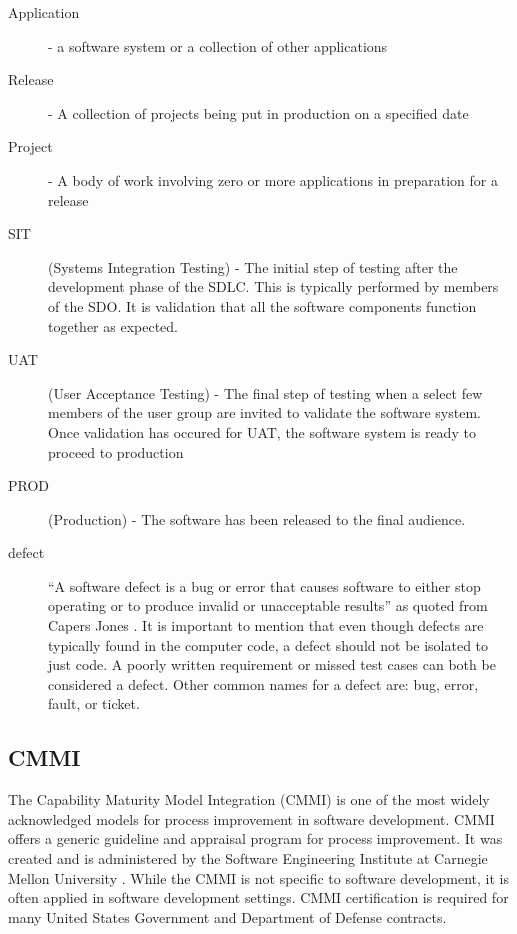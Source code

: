 \documentclass[SDSUThesis.tex]{subfiles}
\begin{document}
    \begin{description}
    
        \item[Application] - a software system or a collection of other applications 
        \item[Release] - A collection of projects being put in production on a specified date
        \item[Project] - A body of work involving zero or more applications in preparation for a release
        \item[SIT]   (Systems Integration Testing) - The initial step of testing
            after the development phase of the SDLC.  This is typically 
            performed by members of the SDO.  It is validation that all the
            software components function together as expected.
        \item[UAT]   (User Acceptance Testing) - The final step of testing
            when a select few members of the user group are invited to
            validate the software system. Once validation has occured for
            UAT, the software system is ready to proceed to production
        \item[PROD]  (Production) - The software has been released to the final audience.
        \item[defect] ``A software defect is a bug or error that causes
                    software to either stop operating or to produce
                    invalid or unacceptable results'' as quoted from Capers Jones
                \cite{Jones2009}.  It is important to mention that even though defects are typically 
                found in the computer code, a defect should not be isolated to just code.   
                A poorly written requirement or missed test cases can 
                both be considered a defect.  Other common names for a defect 
                are: bug, error, fault, or ticket.
    \end{description}


\subsection{CMMI}
    The Capability Maturity Model Integration (CMMI) is one of the most 
    widely acknowledged models for process 
    improvement in software development.  CMMI offers a generic guideline 
    and appraisal program for process 
    improvement.  It was created and is administered by the 
    Software Engineering Institute at
    Carnegie Mellon University \cite{CMMI}. While the CMMI is not specific to software development,
    it is often applied in software development settings.
    CMMI certification is required for many United States Government 
    and Department of Defense contracts. 
    
\end{document}
